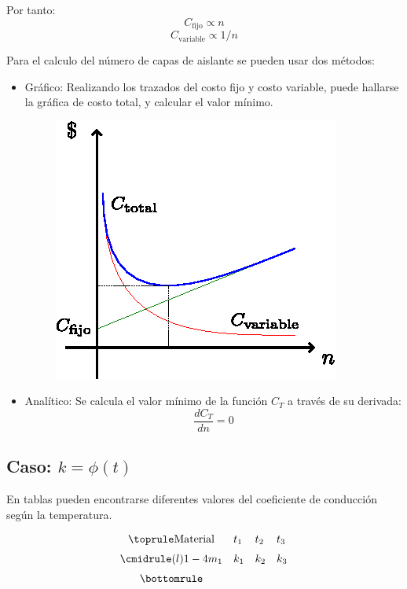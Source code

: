 Por tanto:
\begin{equation*}
    C_{\text{fijo}}\propto n
\end{equation*}
\begin{equation*}
    C_{\text{variable}}\propto 1/n
\end{equation*}

Para el calculo del número de capas de aislante se pueden usar dos métodos:
\begin{itemize}
    \item Gráfico: Realizando los trazados del costo fijo y costo variable,
    puede hallarse la gráfica de costo total, y calcular el valor mínimo.
        \begin{figure}[!h]
        \centering
        \includegraphics[scale=1.50]{figura02_17.eps}
        \end{figure}
    \item Analítico: Se calcula el valor mínimo de la función $C_T$ a través de
    su derivada:
        \begin{equation*}
            \frac{dC_T}{dn}=0
        \end{equation*}
\end{itemize}

\subsection{Caso: $k=\phi(t)$}
En tablas pueden encontrarse diferentes valores del coeficiente de conducción
según la temperatura.
\begin{equation*}
\def\arraystretch{1.5}
\begin{array}{@{}clll@{}}
\toprule
\text{Material} & t_1 & t_2 & t_3 \\
\cmidrule(l){1-4}
m_1 & k_1 & k_2 & k_3\\
\bottomrule
\end{array}
\end{equation*}

